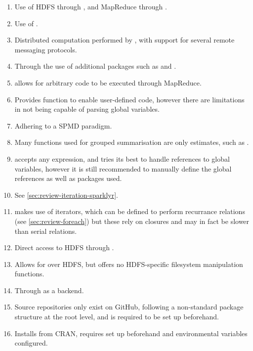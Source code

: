 \begin{enumerate}
\item\label{itm:x1} Use of HDFS through \cite{revo2013rhdfs}, and MapReduce through \cite{revo2014plyrmr}.
\item\label{itm:x2} Use of \cite{luraschi20}.
\item\label{itm:x3} Distributed computation performed by , with support for several remote messaging protocols\cites{Chen2012pbdMPIpackage,Schmidt2015pbdCSpackage}.
\item\label{itm:x4} Through the use of additional packages such as  and \cites{weston17,luraschi20}.
\item\label{itm:x5} \cite{revo2015rmr2} allows for arbitrary \R{} code to be executed through MapReduce.
\item\label{itm:x6}Provides  function to enable user-defined code, however there are limitations in not being capable of parsing global variables.
\item\label{itm:x7} Adhering to a SPMD paradigm.
\item\label{itm:x8} Many functions used for grouped summarisation are only estimates, such as \cite{zj19:_group_by}.
\item\label{itm:x9}  accepts any expression, and tries its best to handle references to global variables, however it is still recommended to manually define the global references as well as packages used.
\item\label{itm:x10} See \cref{sec:review-iteration-sparklyr}.
\item\label{itm:x11}  makes use of iterators, which can be defined to perform recurrance relations (see \cref{sec:review-foreach}) but these rely on closures and may in fact be slower than serial relations.
\item\label{itm:x12} Direct access to HDFS through \cite{revo2013rhdfs}.
\item\label{itm:x13} Allows for  over HDFS, but offers no HDFS-specific filesystem manipulation functions.
\item\label{itm:x14} Through  as a backend.
\item\label{itm:x15} Source repositories only exist on GitHub, following a non-standard package structure at the root level, and  is required to be set up beforehand.
\item\label{itm:x16} Installs from CRAN, requires  set up beforehand and environmental variables configured.

\end{enumerate}
